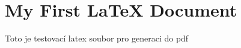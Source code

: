 \documentclass{article}
\begin{document}
\section{My First LaTeX Document}

Toto je testovací latex soubor pro generaci do pdf
\end{document}
